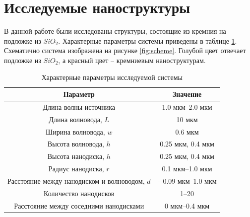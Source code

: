 \section{Исследуемые наноструктуры}

В данной работе были исследованы структуры, состоящие из кремния на подложке из $SiO_2$. Характерные параметры системы приведены в таблице \ref{tbl:params}. Схематично система изображена на рисунке \ref{fig:scheme}. Голубой цвет отвечает подложке из $SiO_2$, а красный цвет -- кремниевым наноструктурам.

\begin{table}[H]
	\centering
	\begin{tabular}{|c|c|}
		\hline
		Параметр & Значение\\
		\hline
		\hline
		Длина волны источника & 1.0 мкм--2.0 мкм \\
		\hline
		Длина волновода, $L$ & 10 мкм \\
		\hline
		Ширина волновода, $w$ & 0.6 мкм \\
		\hline
		Высота волновода, $h$ & 0.25 мкм, 0.4 мкм \\
		\hline
		Высота нанодиска, $h$ & 0.25 мкм, 0.4 мкм \\
		\hline
		Радиус нанодиска, $r$ & 0.1 мкм--1.0 мкм\\
		\hline
		Расстояние между нанодиском и волноводом, $d$ & $-$0.09 мкм--1.0 мкм\\
		\hline
		Количество нанодисков & 1--20 \\
		\hline
		Расстояние между соседними нанодисками & 0 мкм--0.4 мкм \\
		\hline
	\end{tabular}
	\caption{Характерные параметры исследуемой системы}
	\label{tbl:params}
\end{table}

